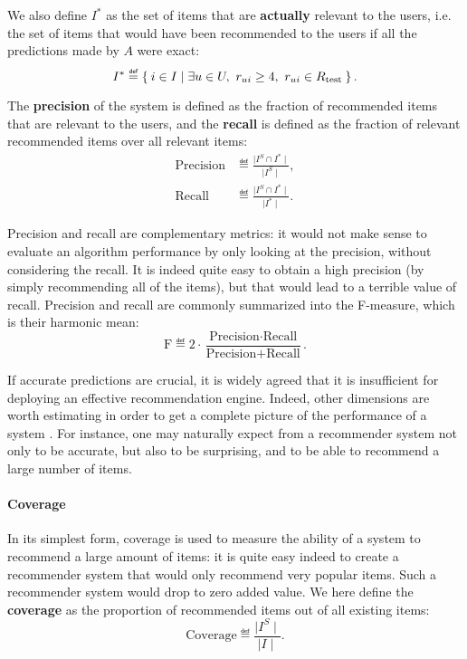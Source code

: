 We also define $I^*$ as the set of items that are \textbf{actually} relevant to
the users, i.e.  the set of items that would have been recommended to the users
if all the predictions made by $A$ were exact:
$$I^* \eqdef \Set{i \in I | \exists u \in U, ~\rui \geq 4,~ \rui \in \Rtest}.$$

\noindent
The \textbf{precision} of the
system is
defined as the fraction of recommended items that are relevant to the users,
and the \textbf{recall} is defined as the fraction of relevant recommended
items over all relevant items:
\begin{align*}
  \text{Precision} &\eqdef \frac{\mid I^S \cap I^*\mid}{\mid I^S \mid},\\
  \text{Recall} &\eqdef \frac{\mid I^S \cap I^*\mid}{\mid I^* \mid}.
\end{align*}

Precision and recall are complementary metrics: it would not make sense to
evaluate an algorithm performance by only looking at the precision, without
considering the recall. It is indeed quite easy to obtain a high precision (by
simply recommending all of the items), but that would lead to a terrible
value of recall. Precision and recall are commonly summarized into the
F-measure, which is their harmonic mean:
  $$
  \text{F} \eqdef 2 \cdot \frac{\text{Precision} \cdot
  \text{Recall}}{\text{Precision} + \text{Recall}}.
  $$

If accurate predictions are crucial, it is widely agreed that it is
insufficient for deploying an effective recommendation engine. Indeed,
other dimensions are worth estimating in order to get a complete picture of the
performance of a system
\cite{NeeRieKonACM2006,HerKonJohTerRieACM2004,KamBriRecSys2014}.  For instance,
one may naturally expect from a recommender system not only to be accurate, but
also to be surprising, and to be able to recommend a large number of items.

\paragraph{Coverage\\}
In its simplest form, coverage is used to measure the ability of a system to
recommend a large amount of items: it is quite easy indeed to create a
recommender system that would only recommend very popular items. Such a
recommender system would drop to zero added value. We here define the
\textbf{coverage} as the proportion of recommended items out of all existing
items:
$$\text{Coverage} \eqdef \frac{\mid I^S\mid}{\mid I\mid}.$$


